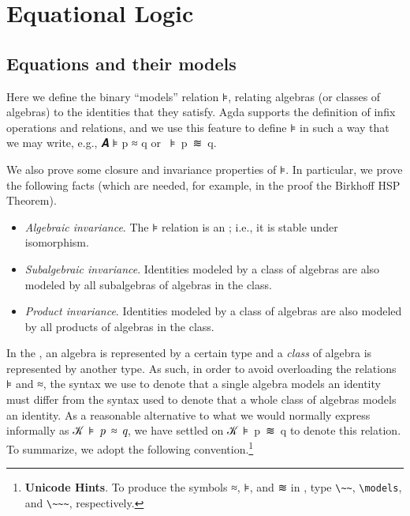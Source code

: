 \section{Equational Logic}\label{sec:equational-logic}

\subsection{Equations and their models}\label{sec:equations-their-models}
Here we define the binary ``models'' relation \af ⊧, relating algebras (or classes of algebras) to the
identities that they satisfy. Agda supports the definition of infix operations and relations, and we 
use this feature to define \af ⊧ in such a way that we may write, e.g., \ab 𝑨 \af ⊧ \ab p \af ≈ \ab q
or ~\af ⊧~\ab p~\af ≋~\ab q.

We also prove some closure and invariance properties of \af ⊧. In particular, we prove the following facts (which are needed, for example, in the proof the Birkhoff HSP Theorem).

\begin{itemize}
\item \emph{Algebraic invariance}. The \af ⊧ relation is an ; i.e., it is stable under isomorphism.
\item \emph{Subalgebraic invariance}. Identities modeled by a class of algebras are also modeled by all subalgebras of algebras in the class.
\item \emph{Product invariance}. Identities modeled by a class of algebras are also modeled by all products of
  algebras in the class.
\end{itemize}

In the \agdaualib, an algebra is represented by a certain type and a \emph{class} of algebra is represented by another type. As such, in order to avoid overloading the relations \af ⊧ and \af ≈, the syntax we use to denote that a single algebra models an identity must differ from the syntax used to denote that a whole class of algebras models an identity. As a reasonable alternative to what we would normally express informally as \ab 𝒦~\af ⊧~\ab 𝑝~\af ≈~\ab 𝑞, we have settled on \ab 𝒦~\af ⊧~\ab p~\af ≋~\ab q to denote this relation. To summarize, we adopt the following convention.\footnote{%
\textbf{Unicode Hints}. To produce the symbols \af ≈, \af ⊧, and \af ≋ in \agdamode, type
\texttt{\textbackslash{}\textasciitilde{}\textasciitilde{}},
\texttt{\textbackslash{}models}, and
\texttt{\textbackslash{}\textasciitilde{}\textasciitilde{}\textasciitilde{}},
respectively.}


